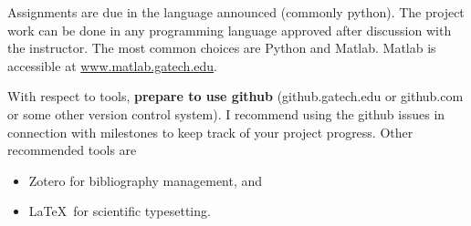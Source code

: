    Assignments are due in the language announced (commonly python). The project work can be done in any programming language approved after discussion with the instructor. The most common choices are Python and Matlab. Matlab is accessible at \url{www.matlab.gatech.edu}.
    
    With respect to tools, \textbf{prepare to use github} (github.gatech.edu or github.com or some other version control system). I recommend using the github issues in connection with milestones to keep track of your project progress. Other recommended tools are
    \begin{itemize}
        \item   Zotero for bibliography management, and
        \item   \LaTeX\ for scientific typesetting.
    \end{itemize}
